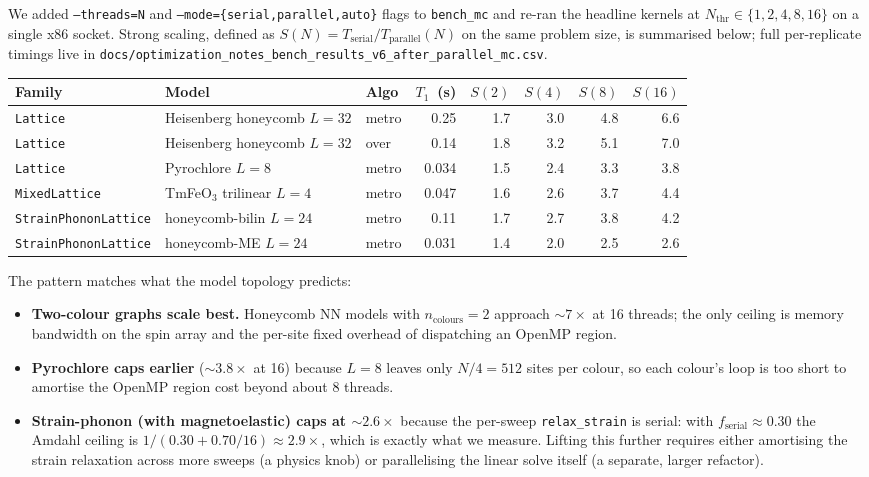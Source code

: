 \documentclass[11pt,letterpaper]{article}
\begin{document}
We added \texttt{--threads=N} and \texttt{--mode=\{serial,parallel,auto\}}
flags to \texttt{bench\_mc} and re-ran the headline kernels at
$N_{\text{thr}} \in \{1, 2, 4, 8, 16\}$ on a single x86 socket.  Strong
scaling, defined as $S(N) = T_{\text{serial}} / T_{\text{parallel}}(N)$
on the same problem size, is summarised below; full per-replicate
timings live in
\texttt{docs/optimization\_notes\_bench\_results\_v6\_after\_parallel\_mc.csv}.

\begin{center}
\small
\begin{tabular}{lllrrrrr}
\hline
Family & Model & Algo & $T_1$~(s) & $S(2)$ & $S(4)$ & $S(8)$ & $S(16)$ \\
\hline
\texttt{Lattice} & Heisenberg honeycomb $L=32$ & metro & 0.25 & 1.7 & 3.0 & 4.8 & 6.6 \\
\texttt{Lattice} & Heisenberg honeycomb $L=32$ & over  & 0.14 & 1.8 & 3.2 & 5.1 & 7.0 \\
\texttt{Lattice} & Pyrochlore $L=8$            & metro & 0.034 & 1.5 & 2.4 & 3.3 & 3.8 \\
\texttt{MixedLattice} & TmFeO$_3$ trilinear $L=4$ & metro & 0.047 & 1.6 & 2.6 & 3.7 & 4.4 \\
\texttt{StrainPhononLattice} & honeycomb-bilin $L=24$ & metro & 0.11 & 1.7 & 2.7 & 3.8 & 4.2 \\
\texttt{StrainPhononLattice} & honeycomb-ME $L=24$    & metro & 0.031 & 1.4 & 2.0 & 2.5 & 2.6 \\
\hline
\end{tabular}
\end{center}

The pattern matches what the model topology predicts:

\begin{itemize}[noitemsep]
  \item \textbf{Two-colour graphs scale best.}  Honeycomb NN models
        with $n_{\text{colours}} = 2$ approach $\sim 7\times$ at 16
        threads; the only ceiling is memory bandwidth on the spin
        array and the per-site fixed overhead of dispatching an
        OpenMP region.
  \item \textbf{Pyrochlore caps earlier} ($\sim 3.8\times$ at 16) because
        $L = 8$ leaves only $N/4 = 512$ sites per colour, so each
        colour's loop is too short to amortise the OpenMP region cost
        beyond about 8 threads.
  \item \textbf{Strain-phonon (with magnetoelastic) caps at $\sim 2.6\times$}
        because the per-sweep \texttt{relax\_strain} is serial: with
        $f_{\text{serial}} \approx 0.30$ the Amdahl ceiling is
        $1 / (0.30 + 0.70/16) \approx 2.9\times$, which is exactly
        what we measure.  Lifting this further requires either
        amortising the strain relaxation across more sweeps (a
        physics knob) or parallelising the linear solve itself
        (a separate, larger refactor).
\end{itemize}
\end{document}
